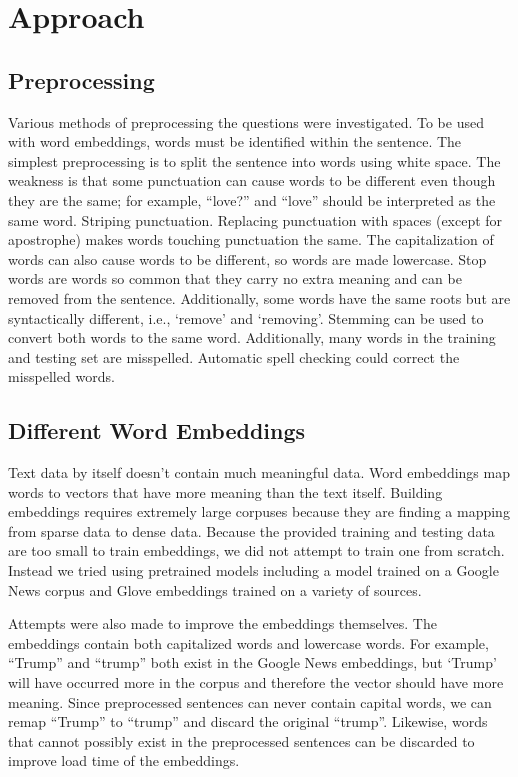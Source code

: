 \documentclass{article}
\begin{document}
\section{Approach}

\subsection{Preprocessing}

Various methods of preprocessing the questions were investigated. To be used with word embeddings, words must be identified within the sentence. The simplest preprocessing  is to split the sentence into words using white space. The weakness is that some punctuation can cause words to be different even though they are the same; for example, ``love?'' and ``love'' should be interpreted as the same word. Striping punctuation. Replacing punctuation with spaces (except for apostrophe) makes words touching punctuation the same. The capitalization of words can also cause words to be different, so words are made lowercase. Stop words are words so common that they carry no extra meaning and can be removed from the sentence. Additionally, some words have the same roots but are syntactically different, i.e., `remove' and `removing'. Stemming can be used to convert both words to the same word. Additionally, many words in the training and testing set are misspelled. Automatic spell checking could correct the misspelled words.

\subsection{Different Word Embeddings}

Text data by itself doesn't contain much meaningful data. Word embeddings map words to vectors that have more meaning than the text itself. Building embeddings requires extremely large corpuses because they are finding a mapping from sparse data to dense data. Because the provided training and testing data are too small to train embeddings, we did not attempt to train one from scratch. Instead we tried using pretrained models including a model trained on a Google News corpus and Glove embeddings trained on a variety of sources.

Attempts were also made to improve the embeddings themselves. The embeddings contain both capitalized words and lowercase words. For example, ``Trump'' and ``trump'' both exist in the Google News embeddings, but `Trump' will have occurred more in the corpus and therefore the vector should have more meaning. Since preprocessed sentences can never contain capital words, we can remap ``Trump'' to ``trump'' and discard the original ``trump''. Likewise, words that cannot possibly exist in the preprocessed sentences can be discarded to improve load time of the embeddings.
\end{document}
